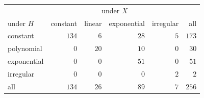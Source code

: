 \begin{tabular}{lrrrrr}
\hline
 & \multicolumn{4}{c}{under $X$} & \\
under $H$ & constant & linear & exponential & irregular & all \\
\hline
constant & $134$ & $6$ & $28$ & $5$ & $173$ \\
polynomial & $0$ & $20$ & $10$ & $0$ & $30$ \\
exponential & $0$ & $0$ & $51$ & $0$ & $51$ \\
irregular & $0$ & $0$ & $0$ & $2$ & $2$ \\
\hline
all & $134$ & $26$ & $89$ & $7$ & $256$ \\
\hline
\end{tabular}
